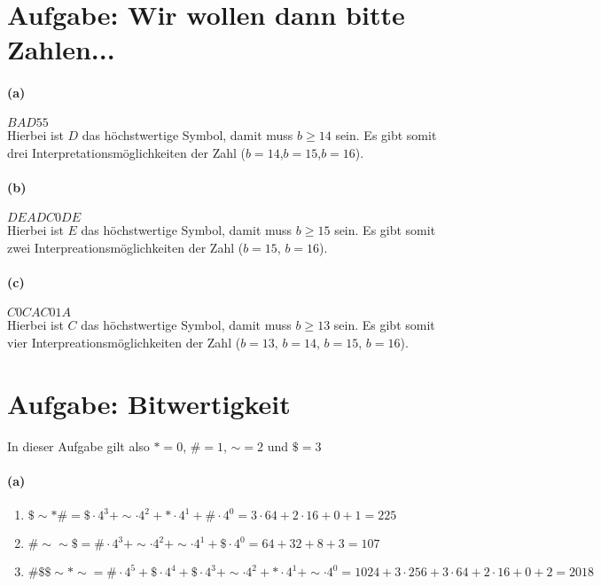 \documentclass[a4paper]{article}
\begin{document}
\section{Aufgabe: Wir wollen dann bitte Zahlen...}
\paragraph{(a)}
$BAD55$\\
Hierbei ist $D$ das höchstwertige Symbol, damit muss $b\geq 14$ sein. Es gibt somit drei Interpretationsmöglichkeiten der Zahl ($b=14$,$b=15$,$b=16$).

\paragraph{(b)}
$DEADC0DE$\\
Hierbei ist $E$ das höchstwertige Symbol, damit muss $b\geq 15$ sein. Es gibt somit zwei Interpreationsmöglichkeiten der Zahl ($b=15$, $b=16$).

\paragraph{(c)}
$C0CAC01A$\\
Hierbei ist $C$ das höchstwertige Symbol, damit muss $b\geq	13$ sein. Es gibt somit vier Interpreationsmöglichkeiten der Zahl ($b=13$, $b=14$, $b=15$, $b=16$).

\section{Aufgabe: Bitwertigkeit}
In dieser Aufgabe gilt also $*=0$, $\#=1$, $\sim=2$ und $\$=3$

\paragraph{(a)}

\begin{enumerate}
	\item $ \$ \sim *\# = \$\cdot 4^3 + \sim\cdot4^2 + *\cdot 4^1 + \#\cdot4^0 = 3\cdot 64 + 2\cdot 16 + 0 + 1 = 225$ 
	\item $ \#\sim\sim\$ = \#\cdot4^3 + \sim\cdot4^2 + \sim\cdot4^1 + \$\cdot4^0 = 64 + 32 + 8 + 3 = 107$
	\item $ \#\$\$\sim * \sim = \#\cdot4^5 + \$\cdot 4^4 + \$\cdot 4^3 + \sim\cdot4^2 + *\cdot4^1 + \sim\cdot4^0 =1024 + 3\cdot256 + 3\cdot 64 + 2\cdot 16 + 0 + 2 = 2018  $	
\end{enumerate}
\end{document}
